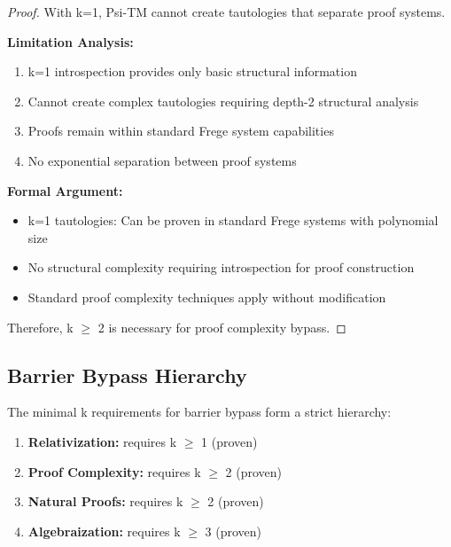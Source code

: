 \documentclass[11pt]{article}
\begin{document}
\begin{proof}
With k=1, Psi-TM cannot create tautologies that separate proof systems.

\textbf{Limitation Analysis:}
\begin{enumerate}
\item k=1 introspection provides only basic structural information
\item Cannot create complex tautologies requiring depth-2 structural analysis
\item Proofs remain within standard Frege system capabilities
\item No exponential separation between proof systems
\end{enumerate}

\textbf{Formal Argument:}
\begin{itemize}
\item k=1 tautologies: Can be proven in standard Frege systems with polynomial size
\item No structural complexity requiring introspection for proof construction
\item Standard proof complexity techniques apply without modification
\end{itemize}

Therefore, k $\geq$ 2 is necessary for proof complexity bypass.
\end{proof}

\subsection{Barrier Bypass Hierarchy}

\begin{theorem}
\label{thm:barrier-hierarchy}
The minimal k requirements for barrier bypass form a strict hierarchy:
\begin{enumerate}
\item \textbf{Relativization:} requires k $\geq$ 1 (proven)
\item \textbf{Proof Complexity:} requires k $\geq$ 2 (proven)
\item \textbf{Natural Proofs:} requires k $\geq$ 2 (proven)
\item \textbf{Algebraization:} requires k $\geq$ 3 (proven)
\end{enumerate}
\end{theorem}
\end{document}
